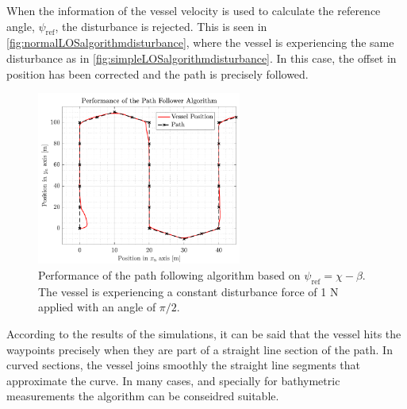 When the information of the vessel velocity is used to calculate the reference angle, $\psi_\mathrm{ref}$, the disturbance is rejected. This is seen in \autoref{fig:normalLOSalgorithmdisturbance}, where the vessel is experiencing the same disturbance as in \autoref{fig:simpleLOSalgorithmdisturbance}. In this case, the offset in position has been corrected and the path is precisely followed.
\begin{figure}[H]
	\includegraphics[width=0.6\textwidth]{figures/pathfollowingcomplex}
	\caption{Performance of the path following algorithm based on $\psi_\mathrm{ref}=\chi-\beta$. The vessel is experiencing a constant disturbance force of 1 N applied with an angle of $\pi/2$.}
	\label{fig:normalLOSalgorithmdisturbance}
\end{figure}
According to the results of the simulations, it can be said that the vessel hits the waypoints precisely when they are part of a straight line section of the path. In curved sections, the vessel joins smoothly the straight line segments that approximate the curve. In many cases, and specially for bathymetric measurements the algorithm can be conseidred suitable.

	



